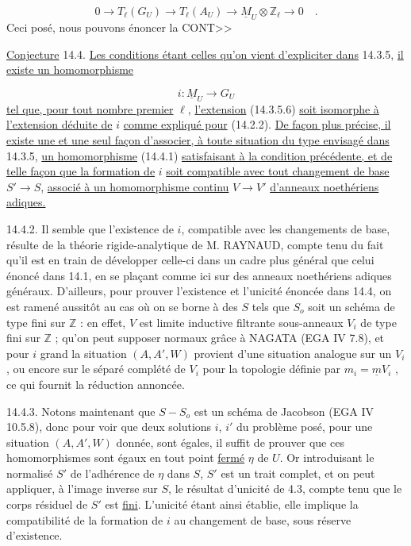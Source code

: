 \begin{equation}\tag{14.3.5.6}
0 \longrightarrow T_\ell(G_U) \longrightarrow T_\ell(A_U) \longrightarrow \underline{M}_U \otimes \mathbb{Z}_\ell \longrightarrow 0 \quad .
\end{equation}
Ceci posé, nous pouvons énoncer la CONT>>



\underline{Conjecture} 14.4. \underline{Les conditions étant celles qu'on vient d'expliciter dans} 14.3.5, \underline{il existe un homomorphisme}

\begin{equation}\tag{14.4.1}
i : \underline{M}_U \longrightarrow G_U
\end{equation}
\underline{tel que, pour tout nombre premier} $\ell$, \underline{l'extension} (14.3.5.6) \underline{soit isomorphe à l'extension déduite de} $i$ \underline{comme expliqué pour} (14.2.2). \underline{De façon plus précise, il existe une et une seul façon d'associer, à toute situation du type envisagé dans} 14.3.5, \underline{un homomorphisme} (14.4.1) \underline{satisfaisant à la condition précédente, et de telle façon que la formation de} $i$ \underline{soit compatible avec tout changement de base} $S' \longrightarrow S$, \underline{associé à un homomorphisme continu} $V \longrightarrow V'$ \underline{d'anneaux noethériens adiques.}

14.4.2. Il semble que l'existence de $i$, compatible avec les changements de base, résulte de la théorie rigide-analytique de M. RAYNAUD, compte tenu du fait qu'il est en train de développer celle-ci dans un cadre plus général que celui énoncé dans 14.1, en se plaçant comme ici sur des anneaux noethériens adiques généraux. D'ailleurs, pour prouver l'existence et l'unicité énoncée dans 14.4, on est ramené aussitôt au cas où on se borne à des $S$ tels que $S_o$ soit un schéma de type fini sur $\mathbb{Z}$ : en effet, $V$ est limite inductive filtrante sous-anneaux $V_i$ de type fini sur $\mathbb{Z}$ ; qu'on peut supposer normaux grâce à NAGATA (EGA IV 7.8), et pour $i$ grand la situation $(A,A',W)$ provient d'une situation analogue sur un $V_i$, ou encore sur le séparé complété de $V_i$ pour la topologie définie par $m_i = \underline{m} V_i$ , ce qui fournit la réduction annoncée.



14.4.3. Notons maintenant que $S-S_o$ est un schéma de Jacobson (EGA IV 10.5.8), donc pour voir que deux solutions $i$, $i'$ du problème posé, pour une situation $(A,A',W)$ donnée, sont égales, il suffit de prouver que ces homomorphismes sont égaux en tout point \underline{fermé} $\eta$ de $U$. Or introduisant le normalisé $S'$ de l'adhérence de $\eta$ dans $S$, $S'$ est un trait complet, et on peut appliquer, à l'image inverse sur $S$, le résultat d'unicité de 4.3, compte tenu que le corps résiduel de $S'$ est \underline{fini}. L'unicité étant ainsi établie, elle implique la compatibilité de la formation de $i$ au changement de base, sous réserve d'existence.

